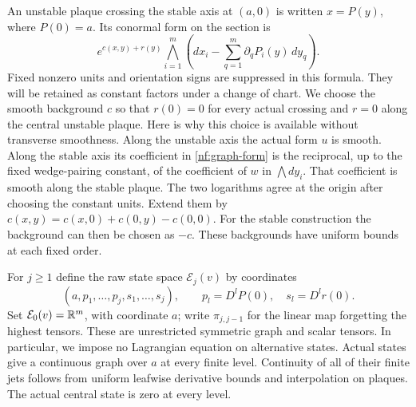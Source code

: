 An unstable plaque crossing the stable axis at $(a,0)$ is written
$x=P(y)$, where $P(0)=a$.  Its conormal form on the section is
\begin{equation}\label{nf:graph-form}
 e^{c(x,y)+r(y)}
 \bigwedge_{i=1}^m\left(dx_i-\sum_{q=1}^m
                    \partial_qP_i(y)\,dy_q\right).
\end{equation}
Fixed nonzero units and orientation signs are suppressed in this
formula.  They will be retained as constant factors under a change
of chart.  We choose the smooth background $c$ so that $r(0)=0$ for
every actual crossing and $r=0$ along the central unstable plaque.
Here is why this choice is available without transverse smoothness.
Along the unstable axis the actual form $u$ is smooth.  Along the
stable axis its coefficient in \eqref{nf:graph-form} is the
reciprocal, up to the fixed wedge-pairing constant, of the coefficient
of $w$ in $\bigwedge dy_i$.  That coefficient is smooth along the
stable plaque.  The two logarithms agree at the origin after choosing
the constant units.  Extend them by
$c(x,y)=c(x,0)+c(0,y)-c(0,0)$.  For the stable construction the
background can then be chosen as $-c$.  These backgrounds have
uniform bounds at each fixed order.

For $j\geq1$ define the raw state space $\mathcal E_j(v)$ by coordinates
\begin{equation}\label{nf:raw-state}
 \left(a,p_1,\ldots,p_j,s_1,\ldots,s_j\right),
 \qquad p_l=D^lP(0),\quad s_l=D^lr(0).
\end{equation}
Set $\mathcal E_0(v)=\mathbb R^m$, with coordinate $a$; write
$\pi_{j,j-1}$ for the linear map forgetting the highest tensors.
These are unrestricted symmetric graph and scalar tensors.
In particular, we impose no Lagrangian equation on alternative
states.  Actual states give a continuous graph over $a$ at every
finite level.  Continuity of all of their finite jets follows from
uniform leafwise derivative bounds and interpolation on plaques.
The actual central state is zero at every level.

